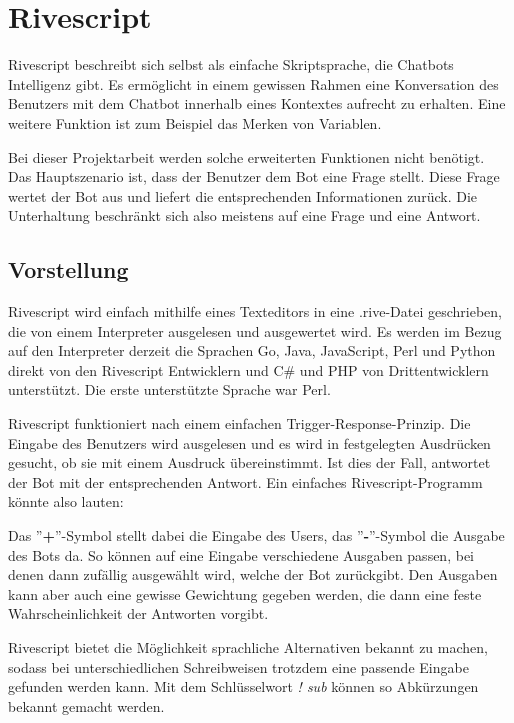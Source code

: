 \chapter{Rivescript} \label{sec:rivescript}
Rivescript beschreibt sich selbst als einfache Skriptsprache, die Chatbots Intelligenz gibt. Es ermöglicht in einem gewissen Rahmen eine Konversation des Benutzers mit dem Chatbot innerhalb eines Kontextes aufrecht zu erhalten. Eine weitere Funktion ist zum Beispiel das Merken von Variablen.

Bei dieser Projektarbeit werden solche erweiterten Funktionen nicht benötigt. Das Hauptszenario ist, dass der Benutzer dem Bot eine Frage stellt. Diese Frage wertet der Bot aus und liefert die entsprechenden Informationen zurück. Die Unterhaltung beschränkt sich also meistens auf eine Frage und eine Antwort.

\section{Vorstellung}
Rivescript wird einfach mithilfe eines Texteditors in eine .rive-Datei geschrieben, die von einem Interpreter ausgelesen und ausgewertet wird. Es werden im Bezug auf den Interpreter derzeit die Sprachen Go, Java, JavaScript, Perl und Python direkt von den Rivescript Entwicklern und C\# und PHP von Drittentwicklern unterstützt. Die erste unterstützte Sprache war Perl.

Rivescript funktioniert nach einem einfachen Trigger-Response-Prinzip. Die Eingabe des Benutzers wird ausgelesen und es wird in festgelegten Ausdrücken gesucht, ob sie mit einem Ausdruck übereinstimmt. Ist dies der Fall, antwortet der Bot mit der entsprechenden Antwort.
Ein einfaches Rivescript-Programm könnte also lauten:


Das ''\textbf{+}''-Symbol stellt dabei die Eingabe des Users, das ''\textbf{-}''-Symbol die Ausgabe des Bots da. So können auf eine Eingabe verschiedene Ausgaben passen, bei denen dann zufällig ausgewählt wird, welche der Bot zurückgibt. Den Ausgaben kann aber auch eine gewisse Gewichtung gegeben werden, die dann eine feste Wahrscheinlichkeit der Antworten vorgibt.


Rivescript bietet die Möglichkeit sprachliche Alternativen bekannt zu machen, sodass bei unterschiedlichen Schreibweisen trotzdem eine passende Eingabe gefunden werden kann.
Mit dem Schlüsselwort \emph{! sub} können so Abkürzungen bekannt gemacht werden.


